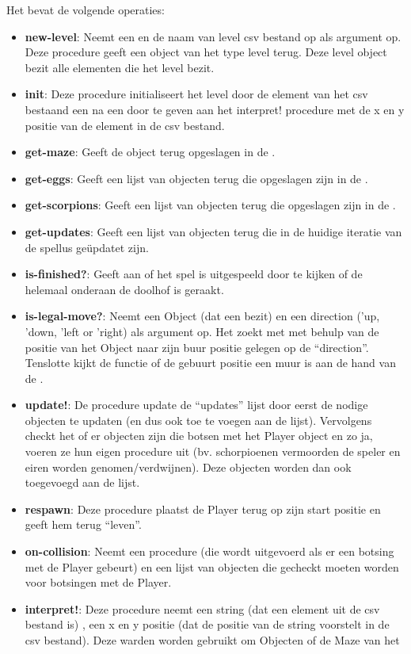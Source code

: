 Het \texttt{} bevat de volgende operaties:
\begin{itemize}
	\item \textbf{new-level}: Neemt een \texttt{} en de naam van level csv bestand op als argument op.
		Deze procedure geeft een object van het type level terug.
		Deze level object bezit alle elementen die het level bezit.
	\item \textbf{init}: Deze procedure initialiseert het level door de element van het csv bestaand een na een door te geven aan het interpret! procedure
		met de x en y positie van de element in de csv bestand.
	\item \textbf{get-maze}: Geeft de \texttt{} object terug opgeslagen in de \texttt{}.
	\item \textbf{get-eggs}: Geeft een lijst van \texttt{} objecten terug die opgeslagen zijn in de \texttt{}.
	\item \textbf{get-scorpions}: Geeft een lijst van \texttt{} objecten terug die opgeslagen zijn in de \texttt{}.
	\item \textbf{get-updates}: Geeft een lijst van objecten terug die in de huidige iteratie van de spellus geüpdatet zijn.
	\item \textbf{is-finished?}: Geeft aan of het spel is uitgespeeld door te kijken of de \texttt{} helemaal onderaan de doolhof is geraakt.
	\item \textbf{is-legal-move?}: Neemt een Object (dat een \texttt{} bezit) en een direction ('up, 'down, 'left or 'right) als argument op.
		Het zoekt met met behulp van de positie van het Object naar zijn buur positie gelegen op de ``direction''.
		Tenslotte kijkt de functie of de gebuurt positie een muur is aan de hand van de \texttt{}.
	\item \textbf{update!}: De procedure update de ``updates'' lijst
		door eerst de nodige objecten te updaten (en dus ook toe te voegen aan de lijst).
		Vervolgens checkt het of er objecten zijn die botsen met het Player object 
		en zo ja, voeren ze hun eigen procedure uit 
		(bv. schorpioenen vermoorden de speler en eiren worden genomen/verdwijnen).
		Deze objecten worden dan ook toegevoegd aan de lijst.
	\item \textbf{respawn}: Deze procedure plaatst de Player terug op zijn start positie en geeft hem terug ``leven''.
	\item \textbf{on-collision}: Neemt een procedure (die wordt uitgevoerd als er een botsing met de Player gebeurt) 
		en een lijst van objecten die gecheckt moeten worden voor botsingen met de Player.
	\item \textbf{interpret!}: Deze procedure neemt een string
		(dat een element uit de csv bestand is)
		, een x en y positie (dat de positie van de string voorstelt in de csv bestand).
		Deze warden worden gebruikt om Objecten of de Maze van het \texttt{}
\end{itemize}

